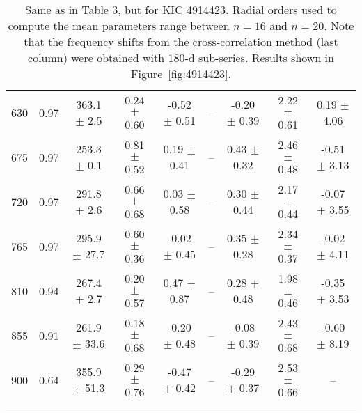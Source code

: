 \documentclass[twocolumn]{aastex61}%
\begin{document}
\begin{table*}[ht]
\begin{tabular}{ccc|ccccc|c}
630 & 0.97 & 363.1 $\pm$ 2.5 & 0.24 $\pm$ 0.60 & -0.52 $\pm$ 0.51 & -- & -0.20 $\pm$ 0.39 & 2.22 $\pm$ 0.61 & 0.19 $\pm$ 4.06\\
675 & 0.97 & 253.3 $\pm$ 0.1 & 0.81 $\pm$ 0.52 & 0.19 $\pm$ 0.41 & -- & 0.43 $\pm$ 0.32 & 2.46 $\pm$ 0.48 & -0.51 $\pm$ 3.13\\
720 & 0.97 & 291.8 $\pm$ 2.6 & 0.66 $\pm$ 0.68 & 0.03 $\pm$ 0.58 & -- & 0.30 $\pm$ 0.44 & 2.17 $\pm$ 0.44 & -0.07 $\pm$ 3.55\\
765 & 0.97 & 295.9 $\pm$ 27.7 & 0.60 $\pm$ 0.36 & -0.02 $\pm$ 0.45 & -- & 0.35 $\pm$ 0.28 & 2.34 $\pm$ 0.37 & -0.02 $\pm$ 4.11\\
810 & 0.94 & 267.4 $\pm$ 2.7 & 0.20 $\pm$ 0.57 & 0.47 $\pm$ 0.87 & -- & 0.28 $\pm$ 0.48 & 1.98 $\pm$ 0.46 & -0.35 $\pm$ 3.53\\
855 & 0.91 & 261.9 $\pm$ 33.6 & 0.18 $\pm$ 0.68 & -0.20 $\pm$ 0.48 & -- & -0.08 $\pm$ 0.39 & 2.43 $\pm$ 0.68 & -0.60 $\pm$ 8.19\\
900 & 0.64 & 355.9 $\pm$ 51.3 & 0.29 $\pm$ 0.76 & -0.47 $\pm$ 0.42 & -- & -0.29 $\pm$ 0.37 & 2.53 $\pm$ 0.66 & --\\\vspace{-0.35cm}
\end{tabular}
\caption{Same as in Table 3, but for KIC 4914423. {Radial orders used to compute the mean parameters range between $n=16$ and $n=20$.} Note that the frequency shifts from the cross-correlation method (last column) were obtained with 180-d sub-series. Results shown in Figure~\ref{fig:4914423}.}\label{tab:4914423}\vspace{-1.cm}
\end{table*}
\end{document}
